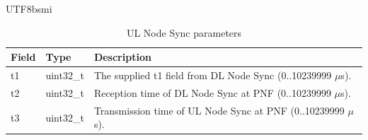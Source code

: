 \documentclass[conference,onecolumn]{IEEEtran}
\begin{document}
\begin{CJK}{UTF8}{bsmi}
\hrulefill\par\vspace{1cm}

\begin{table}[htbp]
\caption{UL Node Sync parameters}
\label{tab:ul_node_sync}
\begin{center}
\begin{tabularx}{\columnwidth}{l|l|X}
\toprule
\textbf{Field} & \textbf{Type} & \textbf{Description} \\ \midrule
t1 & uint32\_t & The supplied t1 field from DL Node Sync (0..10239999 $\mu$s). \\ \midrule
t2 & uint32\_t & Reception time of DL Node Sync at PNF (0..10239999 $\mu$s). \\ \midrule
t3 & uint32\_t & Transmission time of UL Node Sync at PNF (0..10239999 $\mu$s). \\ \bottomrule
\end{tabularx}
\end{center}
\end{table}

\hrulefill\par\vspace{1cm}




\end{CJK}
\end{document}

